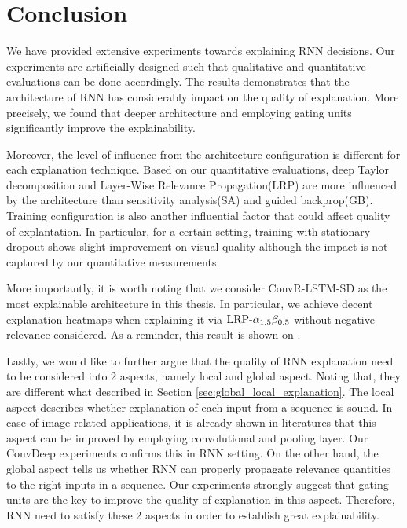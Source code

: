 \chapter{Conclusion}
\label{cha:chapter5}
We have provided extensive experiments towards explaining RNN decisions. Our experiments are artificially designed such that qualitative and quantitative evaluations can be done accordingly.  The results demonstrates that the architecture of RNN has considerably impact on the quality of explanation. More precisely, we found that deeper architecture and employing gating units significantly improve the explainability. 


Moreover, the level of  influence from the architecture configuration is different for each explanation technique. Based on our quantitative evaluations, deep Taylor decomposition and Layer-Wise Relevance Propagation(LRP) are more influenced by the architecture than sensitivity analysis(SA) and guided backprop(GB).  Training configuration is also another influential factor that could affect quality of explantation. In particular, for a certain setting, training with stationary dropout shows slight improvement on visual quality although the impact is not captured by our quantitative measurements.

More importantly, it is worth noting that we consider ConvR-LSTM-SD as the most explainable architecture in this thesis. In particular, we achieve decent explanation heatmaps when explaining it via $\text{LRP-}\alpha_{1.5}\beta_{0.5}$ without negative relevance considered. As a reminder, this result is shown on \addfigure{\ref{fig:heatmap_msc_convrlstm_pos_rel}}.

Lastly, we would like to further argue that the quality of RNN explanation need to be considered into 2 aspects, namely local  and global aspect. Noting that, they are different what described in Section \ref{sec:global_local_explanation}. The local aspect describes whether explanation of each input from a sequence is sound. In case of image related applications, it is already shown in literatures that this aspect can be improved by employing convolutional and pooling layer. Our ConvDeep experiments confirms this in RNN setting. On the other hand, the global aspect tells us whether RNN can properly propagate relevance quantities to the right inputs in a sequence. Our experiments strongly suggest that gating units are the key to improve the quality of explanation in this aspect. Therefore, RNN need to satisfy these 2 aspects in order to establish great explainability.

